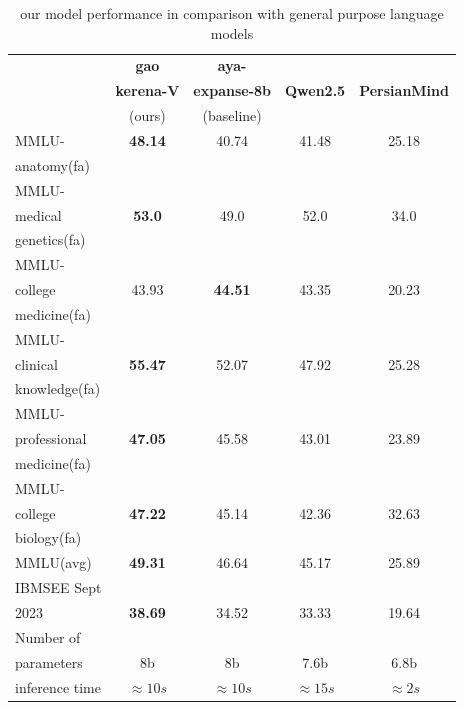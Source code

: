 \documentclass[conference]{IEEEtran}
\begin{document}
	\begin{table}[ht]
		\centering
		\caption{
			our model performance 
			in comparison with general purpose language models
		}
		\begin{tabular}{|l|c|c|c|c|}  %
			\hline
			\textbf{} & \textbf{gao} & \textbf{aya-} &  &  \\ 
			& \textbf{kerena-V} & \textbf{expanse-8b} & \textbf{Qwen2.5} & \textbf{PersianMind} \\
			& (ours) & (baseline) &  &  \\ \hline
			MMLU- & \textbf{48.14} & 40.74 & 41.48 & 25.18 \\ 
			anatomy(fa) &  &  &  &  \\ \hline
			MMLU- &  &  &  &  \\
			medical & \textbf{53.0} & 49.0 & 52.0 & 34.0 \\ 
			genetics(fa) &  &  &  &  \\ \hline
			MMLU- &  &  &  &  \\
			college & 43.93 & \textbf{44.51} & 43.35 & 20.23 \\
			medicine(fa) &  &  &  &  \\ \hline
			MMLU- &  &  &  &  \\
			clinical& \textbf{55.47} & 52.07 & 47.92 & 25.28 \\
			knowledge(fa)&  &  &  &  \\ \hline
			MMLU- &  &  &  &  \\
			professional& \textbf{47.05} & 45.58 & 43.01 & 23.89 \\ 
			medicine(fa)&  &  &  &  \\ \hline
			MMLU- &  &  &  &  \\
			college& \textbf{47.22} & 45.14 & 42.36 & 32.63 \\
			biology(fa)&  &  &  &  \\ \hline
			MMLU(avg) & \textbf{49.31} & 46.64 & 45.17 & 25.89 \\ \hline
			IBMSEE Sept &  &  &  &  \\ 
			2023 & \textbf{38.69} & 34.52 & 33.33 & 19.64 \\  \hline
			Number of&  &  &  &  \\
			parameters & 8b & 8b & 7.6b & 6.8b \\ \hline
			inference time & $\approx 10s$ & $\approx 10s$ & $\approx 15s$ & $\approx 2s$ \\  \hline

		\end{tabular}
		\label{tab:model_results_vs_general_purpose_languages}
	\end{table}
	
\end{document}
